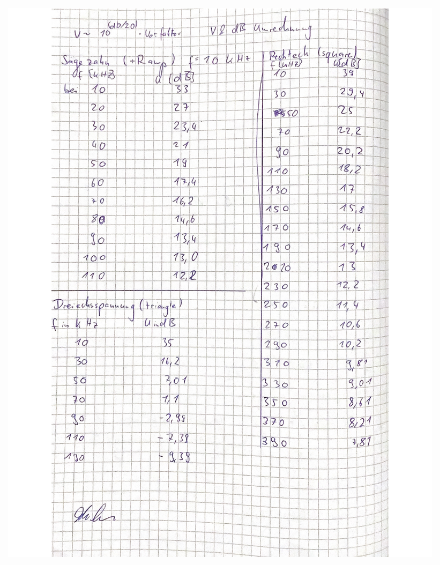  \begin{figure}[H]
   \centering
   \includegraphics[width=\textwidth]{V351_Messwerte_2.pdf}
   \label{fig:Messungen_2}
 \end{figure}